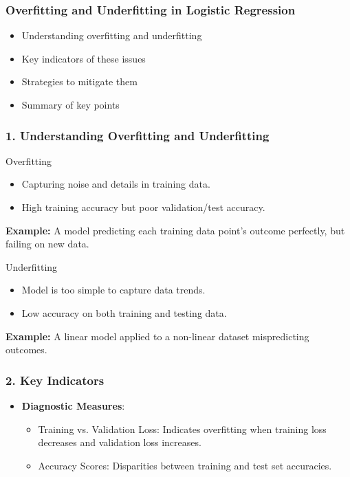 \documentclass[aspectratio=169]{beamer}
\begin{document}
\begin{frame}[fragile]
    \frametitle{Overfitting and Underfitting in Logistic Regression}
    \begin{itemize}
        \item Understanding overfitting and underfitting
        \item Key indicators of these issues
        \item Strategies to mitigate them
        \item Summary of key points
    \end{itemize}
\end{frame}

\begin{frame}[fragile]
    \frametitle{1. Understanding Overfitting and Underfitting}
    \begin{block}{Overfitting}
        \begin{itemize}
            \item Capturing noise and details in training data.
            \item High training accuracy but poor validation/test accuracy.
        \end{itemize}
        \textbf{Example:} A model predicting each training data point's outcome perfectly, but failing on new data.
    \end{block}

    \begin{block}{Underfitting}
        \begin{itemize}
            \item Model is too simple to capture data trends.
            \item Low accuracy on both training and testing data.
        \end{itemize}
        \textbf{Example:} A linear model applied to a non-linear dataset mispredicting outcomes.
    \end{block}
\end{frame}

\begin{frame}[fragile]
    \frametitle{2. Key Indicators}
    \begin{itemize}
        \item \textbf{Diagnostic Measures}:
        \begin{itemize}
            \item Training vs. Validation Loss: Indicates overfitting when training loss decreases and validation loss increases.
            \item Accuracy Scores: Disparities between training and test set accuracies.
        \end{itemize}
    \end{itemize}
\end{frame}
\end{document}
